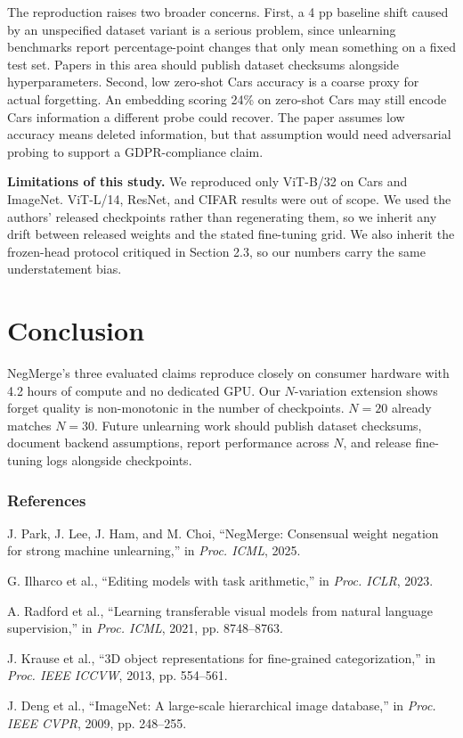 \documentclass{article}
\begin{document}
The reproduction raises two broader concerns. First, a 4 pp baseline shift caused by an unspecified dataset variant is a serious problem, since unlearning benchmarks report percentage-point changes that only mean something on a fixed test set. Papers in this area should publish dataset checksums alongside hyperparameters. Second, low zero-shot Cars accuracy is a coarse proxy for actual forgetting. An embedding scoring 24\% on zero-shot Cars may still encode Cars information a different probe could recover. The paper assumes low accuracy means deleted information, but that assumption would need adversarial probing to support a GDPR-compliance claim.

\textbf{Limitations of this study.} We reproduced only ViT-B/32 on Cars and ImageNet. ViT-L/14, ResNet, and CIFAR results were out of scope. We used the authors' released checkpoints rather than regenerating them, so we inherit any drift between released weights and the stated fine-tuning grid. We also inherit the frozen-head protocol critiqued in Section 2.3, so our numbers carry the same understatement bias.

\section{Conclusion}

NegMerge's three evaluated claims reproduce closely on consumer hardware with 4.2 hours of compute and no dedicated GPU. Our $N$-variation extension shows forget quality is non-monotonic in the number of checkpoints. $N = 20$ already matches $N = 30$. Future unlearning work should publish dataset checksums, document backend assumptions, report performance across $N$, and release fine-tuning logs alongside checkpoints.

\subsubsection*{References}

\begingroup
\scriptsize
\setlength{\parskip}{2pt}

J. Park, J. Lee, J. Ham, and M. Choi, ``NegMerge: Consensual weight negation for strong machine unlearning,'' in \textit{Proc. ICML}, 2025.

G. Ilharco et al., ``Editing models with task arithmetic,'' in \textit{Proc. ICLR}, 2023.

A. Radford et al., ``Learning transferable visual models from natural language supervision,'' in \textit{Proc. ICML}, 2021, pp. 8748--8763.

J. Krause et al., ``3D object representations for fine-grained categorization,'' in \textit{Proc. IEEE ICCVW}, 2013, pp. 554--561.

J. Deng et al., ``ImageNet: A large-scale hierarchical image database,'' in \textit{Proc. IEEE CVPR}, 2009, pp. 248--255.
\endgroup
\end{document}
